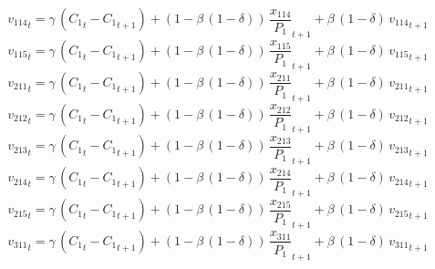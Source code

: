 \begin{dmath}
{{v_{114}}}_{t}={{\gamma}}\, \left({{C_{1}}}_{t}-{{C_{1}}}_{t+1}\right)+\left(1-{{\beta}}\, \left(1-{{\delta}}\right)\right)\, {{\frac{x_{114}}{P_{1}}}}_{t+1}+{{\beta}}\, \left(1-{{\delta}}\right)\, {{v_{114}}}_{t+1}
\end{dmath}
\begin{dmath}
{{v_{115}}}_{t}={{\gamma}}\, \left({{C_{1}}}_{t}-{{C_{1}}}_{t+1}\right)+\left(1-{{\beta}}\, \left(1-{{\delta}}\right)\right)\, {{\frac{x_{115}}{P_{1}}}}_{t+1}+{{\beta}}\, \left(1-{{\delta}}\right)\, {{v_{115}}}_{t+1}
\end{dmath}
\begin{dmath}
{{v_{211}}}_{t}={{\gamma}}\, \left({{C_{1}}}_{t}-{{C_{1}}}_{t+1}\right)+\left(1-{{\beta}}\, \left(1-{{\delta}}\right)\right)\, {{\frac{x_{211}}{P_{1}}}}_{t+1}+{{\beta}}\, \left(1-{{\delta}}\right)\, {{v_{211}}}_{t+1}
\end{dmath}
\begin{dmath}
{{v_{212}}}_{t}={{\gamma}}\, \left({{C_{1}}}_{t}-{{C_{1}}}_{t+1}\right)+\left(1-{{\beta}}\, \left(1-{{\delta}}\right)\right)\, {{\frac{x_{212}}{P_{1}}}}_{t+1}+{{\beta}}\, \left(1-{{\delta}}\right)\, {{v_{212}}}_{t+1}
\end{dmath}
\begin{dmath}
{{v_{213}}}_{t}={{\gamma}}\, \left({{C_{1}}}_{t}-{{C_{1}}}_{t+1}\right)+\left(1-{{\beta}}\, \left(1-{{\delta}}\right)\right)\, {{\frac{x_{213}}{P_{1}}}}_{t+1}+{{\beta}}\, \left(1-{{\delta}}\right)\, {{v_{213}}}_{t+1}
\end{dmath}
\begin{dmath}
{{v_{214}}}_{t}={{\gamma}}\, \left({{C_{1}}}_{t}-{{C_{1}}}_{t+1}\right)+\left(1-{{\beta}}\, \left(1-{{\delta}}\right)\right)\, {{\frac{x_{214}}{P_{1}}}}_{t+1}+{{\beta}}\, \left(1-{{\delta}}\right)\, {{v_{214}}}_{t+1}
\end{dmath}
\begin{dmath}
{{v_{215}}}_{t}={{\gamma}}\, \left({{C_{1}}}_{t}-{{C_{1}}}_{t+1}\right)+\left(1-{{\beta}}\, \left(1-{{\delta}}\right)\right)\, {{\frac{x_{215}}{P_{1}}}}_{t+1}+{{\beta}}\, \left(1-{{\delta}}\right)\, {{v_{215}}}_{t+1}
\end{dmath}
\begin{dmath}
{{v_{311}}}_{t}={{\gamma}}\, \left({{C_{1}}}_{t}-{{C_{1}}}_{t+1}\right)+\left(1-{{\beta}}\, \left(1-{{\delta}}\right)\right)\, {{\frac{x_{311}}{P_{1}}}}_{t+1}+{{\beta}}\, \left(1-{{\delta}}\right)\, {{v_{311}}}_{t+1}
\end{dmath}
